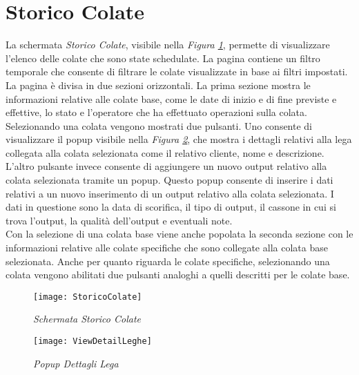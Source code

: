   \section{Storico Colate}
  La schermata \textit{Storico Colate}, visibile nella \textit{Figura \ref{fig:StoricoColate}}, permette di visualizzare
  l'elenco delle colate che sono state schedulate. La pagina contiene un filtro temporale che consente di filtrare
  le colate visualizzate in base ai filtri impostati. La pagina è divisa in due sezioni orizzontali. La prima sezione
  mostra le informazioni relative alle colate base,
  come le date di inizio e di fine previste e effettive, lo stato e l'operatore che ha effettuato operazioni sulla colata.
  Selezionando una colata vengono mostrati due pulsanti. Uno consente di visualizzare il popup visibile 
  nella \textit{Figura \ref{fig:ViewDetailLeghe}},
  che mostra i dettagli relativi alla lega collegata alla colata selezionata come il relativo cliente, nome e descrizione. 
  L'altro pulsante invece consente di aggiungere un nuovo output relativo alla colata selezionata tramite un popup. 
  Questo popup consente di inserire i dati relativi a un nuovo inserimento di un output relativo alla
  colata selezionata. I dati in questione sono la data di scorifica, il tipo di output, il cassone in cui si trova l'output,
  la qualità dell'output e eventuali note.\\
  Con la selezione di una colata base viene anche popolata la seconda sezione con le informazioni relative alle colate specifiche
  che sono collegate alla colata base selezionata. Anche per quanto riguarda le colate specifiche, selezionando 
  una colata vengono abilitati due pulsanti analoghi a quelli descritti per le colate base.
  
  \begin{figure}[H]
    \texttt{[image: StoricoColate]}
    \centering
    \caption{\textit{Schermata Storico Colate}}
    \label{fig:StoricoColate}
  \end{figure}

  \begin{figure}[H]
    \texttt{[image: ViewDetailLeghe]}
    \centering
    \caption{\textit{Popup Dettagli Lega}}
    \label{fig:ViewDetailLeghe}
  \end{figure}
  
